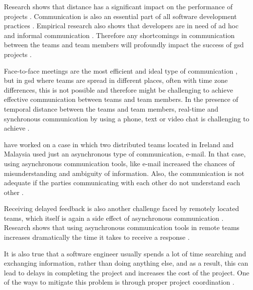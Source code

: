 Research shows that distance has a significant impact on the performance of projects \citep{damian2003global,Herbsleb2001a}. Communication is also an essential part of all software development practices \citep{layman2006essential}. Empirical research also shows that developers are in need of ad hoc and informal communication \citep{grinter1998recomposition,kraut1995coordination}. Therefore any shortcomings in communication between the teams and team members will profoundly impact the success of \ac{gsd} projects \citep{layman2006essential}.

Face-to-face meetings are the most efficient and ideal type of communication \citep{Kirkman2004}, but in \ac{gsd} where teams are spread in different places, often with time zone differences, this is not possible and therefore might be challenging to achieve effective communication between teams and team members. In the presence of temporal distance between the teams and team members, real-time and synchronous communication by using a phone, text or video chat is challenging to achieve \citep{holmstrom2006agile,kommeren2007philips}.

\citet{casey2008impact} have worked on a case in which two distributed teams located in Ireland and Malaysia used just an asynchronous type of communication, e-mail. In that case, using asynchronous communication tools, like e-mail increased the chances of misunderstanding and ambiguity of information. Also, the communication is not adequate if the parties communicating with each other do not understand each other \citep{kommeren2007philips,cataldo2007coordination}.

Receiving delayed feedback is also another challenge faced by remotely located teams, which itself is again a side effect of asynchronous communication \citep{conchuir2006exploring,holmstrom2006agile}. Research shows that using asynchronous communication tools in remote teams increases dramatically the time it takes to receive a response \citep{holmstrom2006global}. 

It is also true that a software engineer usually spends a lot of time searching and exchanging information, rather than doing anything else, and as a result, this can lead to delays in completing the project and increases the cost of the project. One of the ways to mitigate this problem is through proper project coordination \citep{dumitriu2006issues}. 


